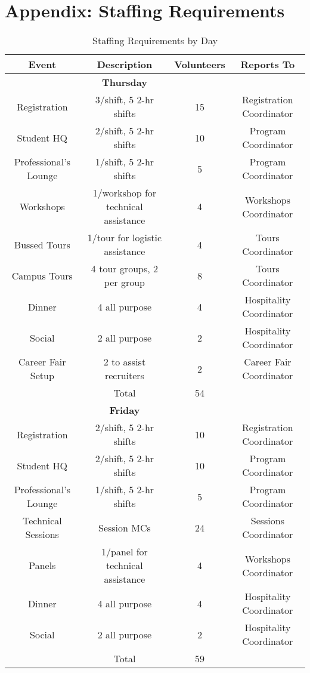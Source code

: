 \section{Appendix: Staffing Requirements}
\label{appendix:staff}

\begin{table}[H]
	\caption{Staffing Requirements by Day}
	\label{table:staff}
	\centering
	\begin{tabular}{ccc|c}
	\hline\hline
	\textbf{Event} & \textbf{Description} & \textbf{Volunteers}& \textbf{Reports To} \\
	\hline\hline
	& \textbf{Thursday} & &\\
	\hline
	Registration & 3/shift, 5 2-hr shifts & 15& Registration Coordinator\\
	Student HQ & 2/shift, 5 2-hr shifts & 10& Program Coordinator\\
	Professional's Lounge & 1/shift, 5 2-hr shifts & 5& Program Coordinator\\
	Workshops & 1/workshop for technical assistance & 4& Workshops Coordinator\\
	Bussed Tours & 1/tour for logistic assistance & 4& Tours Coordinator\\
	Campus Tours & 4 tour groups, 2 per group & 8& Tours Coordinator\\
	Dinner & 4 all purpose & 4& Hospitality Coordinator\\
	Social & 2 all purpose & 2& Hospitality Coordinator\\
	Career Fair Setup & 2 to assist recruiters & 2 & Career Fair Coordinator\\
	\hline	
	& Total & 54&\\
	\hline
	& \textbf{Friday} & &\\
	\hline
	Registration & 2/shift, 5 2-hr shifts & 10& Registration Coordinator\\
	Student HQ & 2/shift, 5 2-hr shifts & 10& Program Coordinator\\
	Professional's Lounge & 1/shift, 5 2-hr shifts & 5& Program Coordinator\\
	Technical Sessions & Session MCs & 24& Sessions Coordinator\\
	Panels & 1/panel for technical assistance & 4& Workshops Coordinator\\
	Dinner & 4 all purpose & 4& Hospitality Coordinator\\
	Social & 2 all purpose & 2& Hospitality Coordinator\\
	\hline
	& Total & 59&\\

\end{tabular}
\end{table}
